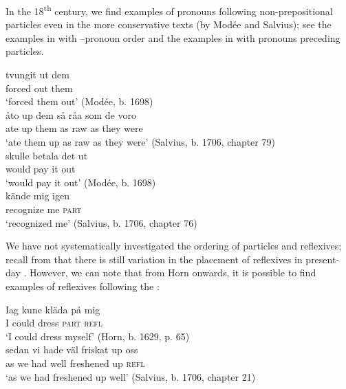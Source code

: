 \documentclass[output=paper]{langscibook}
\begin{document}
In the 18\textsuperscript{th} century, we find examples of pronouns following non-prepositional particles even in the more conservative texts (by Modée and Salvius); see the examples in  with –pronoun order and the examples in  with pronouns preceding particles.


\ea\label{ex:lalu:34}
\ea\label{ex:lalu:34a}
\gll  tvungit   ut   dem\\
   forced   out   them\\
\glt `forced them out’ (Modée, b. 1698)\\

\ex\label{ex:lalu:34b}
\gll  åto  up  dem     så   råa   som  de   voro\\
    ate    up  them    as   raw   as     they   were\\
\glt `ate them up as raw as they were’ (Salvius, b. 1706, chapter 79)\\
\z
\ex\label{ex:lalu:35}
\ea\label{ex:lalu:35a}
\gll  skulle   betala   det   ut\\
    would   pay     it     out\\
\glt `would pay it out’ (Modée, b. 1698)\\

\ex\label{ex:lalu:35b}
\gll  kände     mig   igen \\
   recognize   me   \textsc{part}\\
\glt `recognized me’ (Salvius, b. 1706, chapter 76)\\
\z
\z


We have not systematically investigated the ordering of particles and reflexives; recall from  that there is still variation in the placement of reflexives in present-day . However, we can note that from Horn onwards, it is possible to find examples of reflexives following the :


\ea\label{ex:lalu:36}
\ea\label{ex:lalu:36a}
\gll  Iag   kune   kläda   på     mig\\
    I        could   dress     \textsc{part}    \textsc{refl} \\
\glt `I could dress myself’ (Horn, b. 1629, p. 65)\\

\ex\label{ex:lalu:36b}
\gll  sedan   vi     hade    väl   friskat     up   oss\\
    as         we    had     well   freshened  up   \textsc{refl}\\
  \glt `as we had freshened up well’ (Salvius, b. 1706, chapter 21)\\
\z
\z
\end{document}
